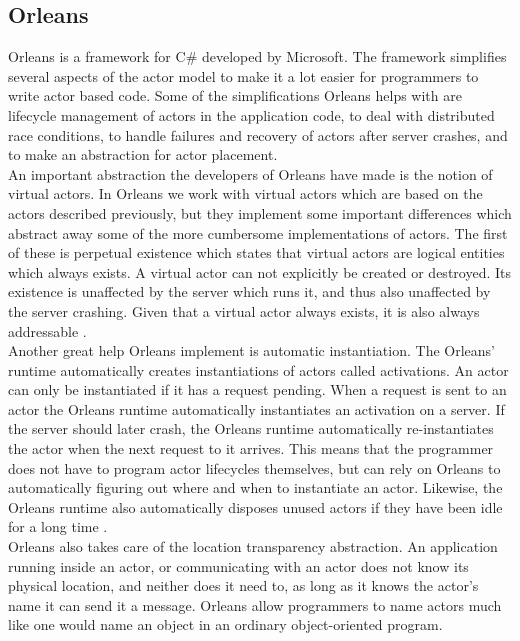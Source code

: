 \subsection{Orleans}
Orleans is a framework for C\# developed by Microsoft. The framework simplifies several aspects of the actor model to make it a lot easier for programmers to write actor based code. Some of the simplifications Orleans helps with are lifecycle management of actors in the application code, to deal with distributed race conditions, to handle failures and recovery of actors after server crashes, and to make an abstraction for actor placement.\\
An important abstraction the developers of Orleans have made is the notion of virtual actors. In Orleans we work with virtual actors which are based on the actors described previously, but they implement some important differences which abstract away some of the more cumbersome implementations of actors. The first of these is perpetual existence which states that virtual actors are logical entities which always exists. A virtual actor can not explicitly be created or destroyed. Its existence is unaffected by the server which runs it, and thus also unaffected by the server crashing. Given that a virtual actor always exists, it is also always addressable \cite{OrleansPaper}.\\
Another great help Orleans implement is automatic instantiation. The Orleans' runtime automatically creates instantiations of actors called activations. An actor can only be instantiated if it has a request pending. When a request is sent to an actor the Orleans runtime automatically instantiates an activation on a server. If the server should later crash, the Orleans runtime automatically re-instantiates the actor when the next request to it arrives. This means that the programmer does not have to program actor lifecycles themselves, but can rely on Orleans to automatically figuring out where and when to instantiate an actor. Likewise, the Orleans runtime also automatically disposes unused actors if they have been idle for a long time \cite{OrleansPaper}.\\
Orleans also takes care of the location transparency abstraction. An application running inside an actor, or communicating with an actor does not know its physical location, and neither does it need to, as long as it knows the actor's name it can send it a message. Orleans allow programmers to name actors much like one would name an object in an ordinary object-oriented program.\\
